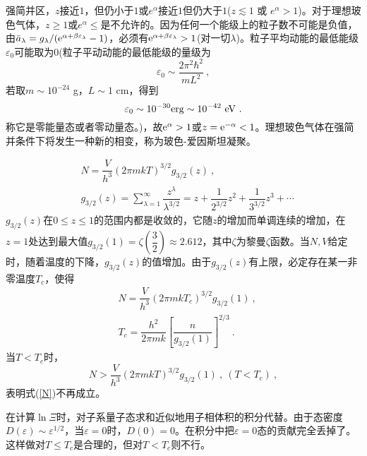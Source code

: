 \documentclass[12pt,a4paper]{article}
\begin{document}
\cite{2007热力学与统计物理学} 强简并区，$z$接近$1$，但仍小于$1$或$e^\alpha$接近$1$但仍大于$1$($z \lesssim 1$ 或 $e^\alpha > 1$)。对于理想玻色气体，$z \geqslant 1$或$e^\alpha \leqslant$是不允许的。因为任何一个能级上的粒子数不可能是负值，由$\bar{a}_\lambda = g_\lambda/({\rm e}^{\alpha +\beta \varepsilon_\lambda} -1)$，必须有${\rm e}^{\alpha +\beta \varepsilon_\lambda} > 1$(对一切$\lambda$)。粒子平均动能的最低能级$\varepsilon_0$可能取为$0$(粒子平动动能的最低能级的量级为
\begin{equation*}
\varepsilon_0 \sim \dfrac{2\pi^2 \hbar^2}{mL^2} ~,
\end{equation*}
若取$m \sim 10^{-24}$ g，$L \sim 1$ cm，得到
\begin{equation*}
\varepsilon_0 \sim 10^{-30} {\rm erg} \sim 10^{-42} ~ {\rm eV} ~.
\end{equation*}
称它是零能量态或者零动量态。)，故${\rm e}^{\alpha} > 1$或$z = {\rm e}^{-\alpha} < 1$。理想玻色气体在强简并条件下将发生一种新的相变，称为玻色-爱因斯坦凝聚。 

\begin{align}
\label{N}
& N = \dfrac{V}{h^3} (2\pi m kT)^{3/2} g_{3/2}(z) ~, \\
& g_{3/2}(z) = \sum_{\lambda =1}^\infty \dfrac{z^\lambda}{\lambda^{3/2}} = z + \dfrac{1}{2^{3/2}} z^2 +\dfrac{1}{3^{3/2}} z^3 +\cdots
\end{align}
$g_{3/2}(z) $在$0\leqslant z \leqslant 1$的范围内都是收敛的，它随$z$的增加而单调连续的增加，在$z=1$处达到最大值$g_{3/2}(1) = \zeta \left(\dfrac{3}{2}\right) \approx 2.612$，其中$\zeta$为黎曼$\zeta$函数。当$N, V$给定时，随着温度的下降，$g_{3/2}(z) $的值增加。由于$g_{3/2}(z) $有上限，必定存在某一非零温度$T_c$，使得
\begin{align}
& N = \dfrac{V}{h^3} (2\pi m kT_c)^{3/2} g_{3/2}(1) ~, \\
& T_c = \dfrac{h^2}{2\pi mk} \left[\dfrac{n}{g_{3/2}(1)} \right]^{2/3} ~.
\end{align}
当$T < T_c$时，
\begin{equation}
N > \dfrac{V}{h^3} (2\pi m kT)^{3/2} g_{3/2}(1) ~, ~(T < T_c) ~,
\end{equation}
表明式(\ref{N})不再成立。

在计算$\ln { \Xi}$时，对子系量子态求和近似地用子相体积的积分代替。由于态密度$D(\varepsilon) \sim \varepsilon^{1/2}$，当$\varepsilon = 0$时，$D(0) = 0$。在积分中把$\varepsilon = 0$态的贡献完全丢掉了。这样做对$T \leqslant T_c$是合理的，但对$T < T_c$则不行。
\end{document}
